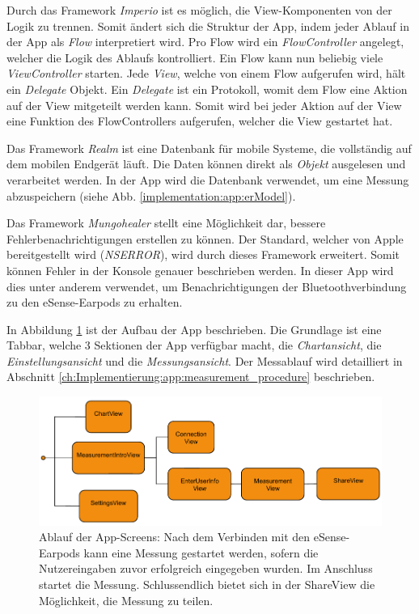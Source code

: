 Durch das Framework \textit{Imperio} ist es möglich, die View-Komponenten von der Logik zu trennen. 
Somit ändert sich die Struktur der App, indem jeder Ablauf in der App als \textit{Flow} interpretiert wird. 
Pro Flow wird ein \textit{FlowController} angelegt, welcher die Logik des Ablaufs kontrolliert. 
Ein Flow kann nun beliebig viele \textit{ViewController} starten.
Jede \textit{View}, welche von einem Flow aufgerufen wird, hält ein \textit{Delegate} Objekt.
Ein \textit{Delegate} ist ein Protokoll, womit dem Flow eine Aktion auf der View mitgeteilt werden kann.
Somit wird bei jeder Aktion auf der View eine Funktion des FlowControllers aufgerufen, welcher die View gestartet hat.

Das Framework \textit{Realm} ist eine Datenbank für mobile Systeme, die vollständig auf dem mobilen Endgerät läuft.
Die Daten können direkt als \textit{Objekt} ausgelesen und verarbeitet werden.
In der App wird die Datenbank verwendet, um eine Messung abzuspeichern (siehe Abb. \ref{implementation:app:erModel}).

Das Framework \textit{Mungohealer} stellt eine Möglichkeit dar, bessere Fehlerbenachrichtigungen erstellen zu können. 
Der Standard, welcher von Apple bereitgestellt wird (\textit{NSERROR}), wird durch dieses Framework erweitert.
Somit können Fehler in der Konsole genauer beschrieben werden. 
In dieser App wird dies unter anderem verwendet, um Benachrichtigungen der Bluetoothverbindung zu den eSense-Earpods zu erhalten.

In Abbildung \ref{systemdesign:appflow} ist der Aufbau der App beschrieben. 
Die Grundlage ist eine Tabbar, welche 3 Sektionen der App verfügbar macht, die \textit{Chartansicht}, die \textit{Einstellungsansicht} und die \textit{Messungsansicht}.
Der Messablauf wird detailliert in Abschnitt \ref{ch:Implementierung:app:measurement_procedure} beschrieben.

\begin{figure}[h]
    \centering
    \includegraphics[width=1\textwidth]{images/study/AppAblauf.pdf}
  \caption{Ablauf der App-Screens: Nach dem Verbinden mit den eSense-Earpods kann eine Messung gestartet werden, sofern die Nutzereingaben zuvor erfolgreich eingegeben wurden. Im Anschluss startet die Messung. Schlussendlich bietet sich in der ShareView die Möglichkeit, die Messung zu teilen.}
  \label{systemdesign:appflow}
 \end{figure}